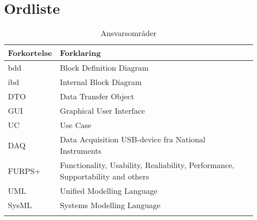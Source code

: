 \chapter{Ordliste}


\begin{longtabu} to 
	\textbf{Forkortelse} & \textbf{Forklaring} \\[-1ex]
	\midrule
	 bdd & Block Definition Diagram \\[-1ex]
	 ibd & Internal Block Diagram \\[-1ex]
	 DTO & Data Transfer Object \\[-1ex]
	 GUI & Graphical User Interface \\[-1ex]
	 UC  & Use Case \\[-1ex]
	 DAQ & Data Acquisition USB-device fra National Instruments \\[-1ex]
	 FURPS+ & Functionality, Usability, Realiability, Performance, Supportability and others\\[-1ex]
	 UML & Unified Modelling Language \\[-1ex]
	 SysML & Systems Modelling Language \\[-1ex]
	 

	\caption{Ansvarsområder}
\end{longtabu}
